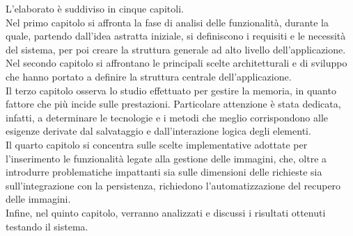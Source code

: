 L'elaborato è suddiviso in cinque capitoli.\\
Nel primo capitolo si affronta la fase di analisi delle funzionalità,
durante la quale, partendo dall'idea astratta iniziale,
si definiscono i requisiti e le necessità del sistema,
per poi creare la struttura generale ad alto livello dell'applicazione.\\
Nel secondo capitolo si affrontano le principali scelte architetturali e di sviluppo
che hanno portato a definire la struttura centrale dell'applicazione.\\
Il terzo capitolo osserva lo studio effettuato per gestire la memoria, 
in quanto fattore che più incide sulle prestazioni. 
Particolare attenzione è stata dedicata, infatti, 
a determinare le tecnologie e i metodi che meglio corrispondono alle esigenze 
derivate dal salvataggio e dall'interazione logica degli elementi.\\
Il quarto capitolo si concentra sulle scelte implementative adottate 
per l'inserimento le funzionalità legate alla gestione delle immagini,
che, oltre a introdurre problematiche impattanti sia sulle dimensioni delle richieste 
sia sull'integrazione con la persistenza, 
richiedono l'automatizzazione del recupero delle immagini.\\
Infine, nel quinto capitolo, verranno analizzati e discussi i risultati ottenuti
testando il sistema.


\clearpage
